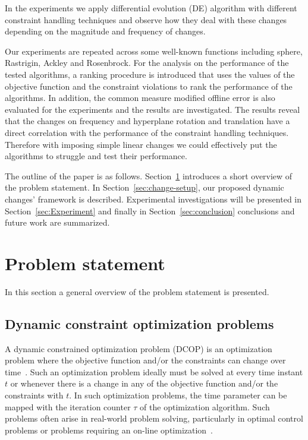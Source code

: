 \documentclass[conference]{IEEEtran}
\begin{document}
In the experiments we apply differential evolution (DE) algorithm with different constraint handling techniques and observe how they deal with these changes depending on the magnitude and frequency of changes. 

Our experiments are repeated across some well-known functions including sphere, Rastrigin, Ackley and Rosenbrock.
For the analysis on the performance of the tested algorithms, a ranking procedure is introduced that uses the values of the objective function and the constraint violations to rank the performance of the algorithms. In addition, the common measure modified offline error is also evaluated for the experiments and the results are investigated.
The results reveal that the changes on frequency and hyperplane rotation and translation have a direct correlation with the performance of the constraint handling techniques. Therefore with imposing simple linear changes we could effectively put the algorithms to struggle and test their performance.

The outline of the paper is as follows. Section~\ref{sec:Prim} introduces a short overview of the problem statement. In Section~\ref{sec:change-setup}, our proposed dynamic changes' framework is described. Experimental investigations will be presented in Section~\ref{sec:Experiment} and finally in Section~\ref{sec:conclusion} conclusions and future work are summarized.

\section{Problem statement}
\label{sec:Prim}
In this section a general overview of the problem statement is presented.
\subsection{Dynamic constraint optimization problems}
A dynamic constrained optimization problem (DCOP) is an optimization problem where the objective function and/or the constraints can change over time~\cite{Nguyen20121}. Such an optimization problem ideally must be solved at every time instant $t$ or whenever there is a change in any of the objective function and/or the constraints with $t$. In such optimization problems, the time parameter can be mapped with the iteration counter $\tau$ of the optimization algorithm. Such problems often arise in real-world problem solving, particularly in optimal control problems or problems requiring an on-line optimization~\cite{de2008plant}.
\end{document}
